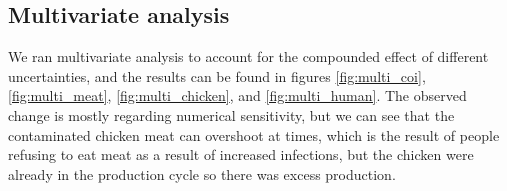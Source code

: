\subsection{Multivariate analysis}

We ran multivariate analysis to account for the compounded effect of different uncertainties, and the results can be found in figures \ref{fig:multi_coi}, \ref{fig:multi_meat}, \ref{fig:multi_chicken}, and \ref{fig:multi_human}. The observed change is mostly regarding numerical sensitivity, but we can see that the contaminated chicken meat can overshoot at times, which is the result of people refusing to eat meat as a result of increased infections, but the chicken were already in the production cycle so there was excess production.



